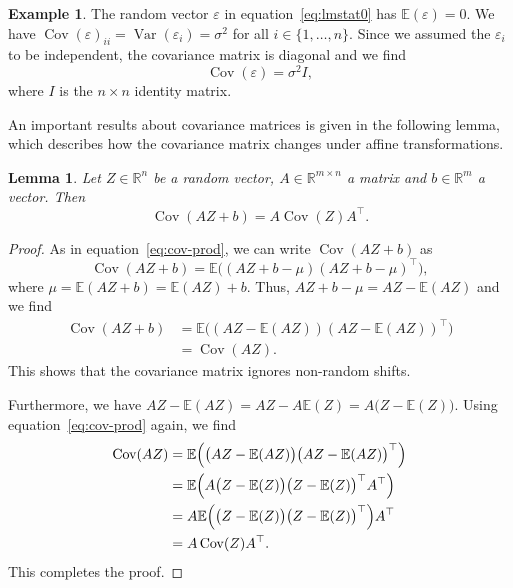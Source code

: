 \documentclass[
  a4paper,
]{article}
\newtheorem{lemma}{Lemma}[section]
\theoremstyle{definition}
\theoremstyle{definition}
\newtheorem{example}{Example}[section]
\theoremstyle{definition}
\theoremstyle{definition}
\theoremstyle{remark}
\begin{document}
\begin{example}
The random vector \(\varepsilon\) in equation~\eqref{eq:lmstat0} has \(\mathbb{E}(\varepsilon) = 0\).
We have
\(\mathop{\mathrm{Cov}}(\varepsilon)_{ii} = \mathop{\mathrm{Var}}(\varepsilon_i) = \sigma^2\) for all \(i\in\{1, \ldots, n\}\).
Since we assumed the \(\varepsilon_i\) to be independent, the covariance matrix is
diagonal and we find
\begin{equation*}
  \mathop{\mathrm{Cov}}(\varepsilon) = \sigma^2 I,
\end{equation*}
where \(I\) is the \(n\times n\) identity matrix.
\end{example}

An important results about covariance matrices is given in the following
lemma, which describes how the covariance matrix changes under affine
transformations.

\begin{lemma}
\protect\hypertarget{lem:Cov-is-quadratic}{}\label{lem:Cov-is-quadratic}Let \(Z\in\mathbb{R}^n\) be a random vector, \(A\in\mathbb{R}^{m\times n}\) a matrix
and \(b\in\mathbb{R}^m\) a vector. Then
\begin{equation*}
  \mathop{\mathrm{Cov}}(AZ+b)
  = A \mathop{\mathrm{Cov}}(Z) A^\top.
\end{equation*}
\end{lemma}

\begin{proof}
As in equation~\eqref{eq:cov-prod}, we can write \(\mathop{\mathrm{Cov}}(AZ+b)\)
as
\begin{equation*}
  \mathop{\mathrm{Cov}}(AZ+b)
  = \mathbb{E}\bigl( (AZ + b - \mu) (AZ + b - \mu)^\top \bigr),
\end{equation*}
where \(\mu = \mathbb{E}(AZ + b) = \mathbb{E}(AZ) + b\). Thus,
\(AZ + b - \mu = AZ - \mathbb{E}(AZ)\) and we find
\begin{align*}
  \mathop{\mathrm{Cov}}(AZ+b)
  &= \mathbb{E}\bigl( (AZ - \mathbb{E}(AZ)) (AZ - \mathbb{E}(AZ))^\top \bigr) \\
  &= \mathop{\mathrm{Cov}}(AZ).
\end{align*}
This shows that the covariance matrix ignores non-random shifts.

Furthermore, we have \(AZ - \mathbb{E}(AZ) = AZ - A\mathbb{E}(Z) = A\bigl(Z - \mathbb{E}(Z)\bigr)\).
Using equation~\eqref{eq:cov-prod} again, we find
\begin{align*}
  \mathop{\mathrm{Cov}}(AZ)
  &= \mathbb{E}\Bigl( \bigl(AZ - \mathbb{E}(AZ)\bigr) \bigl(AZ - \mathbb{E}(AZ)\bigr)^\top \Bigr) \\
  &= \mathbb{E}\Bigl( A \bigl(Z - \mathbb{E}(Z)\bigr) \bigl(Z - \mathbb{E}(Z)\bigr)^\top A^\top \Bigr) \\
  &= A \mathbb{E}\Bigl( \bigl(Z - \mathbb{E}(Z)\bigr) \bigl(Z - \mathbb{E}(Z)\bigr)^\top \Bigr) A^\top \\
  &= A \mathop{\mathrm{Cov}}(Z) A^\top.
\end{align*}
This completes the proof.
\end{proof}
\end{document}
